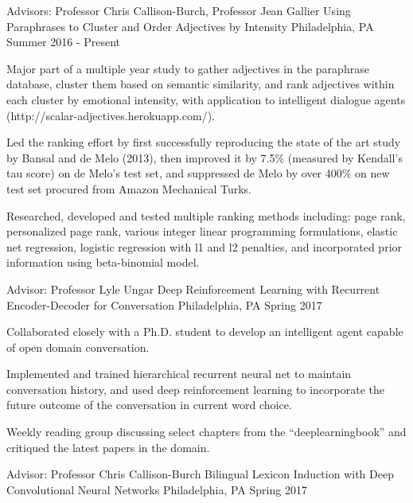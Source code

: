\begin{cventries}
  \cventry
    {Advisors: Professor Chris Callison-Burch, Professor Jean Gallier}
    {Using Paraphrases to Cluster and Order Adjectives by Intensity}
    {Philadelphia, PA}
    {Summer 2016 - Present}
    {
      \begin{cvitems}
        \item {Major part of a multiple year study to gather adjectives in the paraphrase database, cluster them based on semantic similarity, and rank adjectives within each cluster by emotional intensity, with application to intelligent dialogue agents  (http://scalar-adjectives.herokuapp.com/).}
        \item {Led the ranking effort by first successfully reproducing the state of the art study by Bansal and de Melo (2013), then improved it by 7.5\% (measured by Kendall's tau score) on de Melo’s test set, and suppressed de Melo by over 400\% on new test set procured from Amazon Mechanical Turks.}
        \item {Researched, developed and tested multiple ranking methods including: page rank, personalized page rank, various integer linear programming formulations, elastic net regression, logistic regression with l1 and l2 penalties, and incorporated prior information using beta-binomial model.}
      \end{cvitems}
    }
  \cventry
    {Advisor: Professor Lyle Ungar}
    {Deep Reinforcement Learning with Recurrent Encoder-Decoder for Conversation}
    {Philadelphia, PA}
    {Spring 2017}
    {
      \begin{cvitems}
        \item {Collaborated closely with a Ph.D. student to develop an intelligent agent capable of open domain conversation.}
        \item {Implemented and trained hierarchical recurrent neural net to maintain conversation history, and used deep reinforcement learning to incorporate the future outcome of the conversation in current word choice.}
        \item {Weekly reading group discussing select chapters from the “deeplearningbook” and critiqued the latest papers in the domain.}
      \end{cvitems}
    }
  \cventry
    {Advisor: Professor Chris Callison-Burch}
    {Bilingual Lexicon Induction with Deep Convolutional Neural Networks}
    {Philadelphia, PA}
    {Spring 2017}
    {
      \begin{cvitems}

\end{cvitems}}
\end{cventries}
